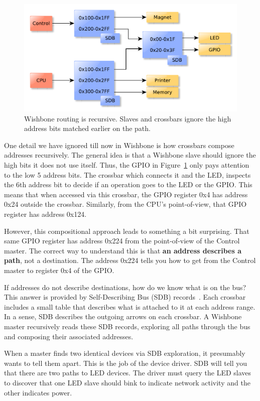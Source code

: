 \documentclass[a4paper]{jacow}
\begin{document}
\begin{figure}[t]
  \centering
  \includegraphics*[width=\columnwidth]{THHA2O03f6}
  \caption{Wishbone routing is recursive. Slaves and crossbars
  ignore the high address bits matched earlier on the path.}
  \label{fig:addressing}
\end{figure}

One detail we have ignored till now in Wishbone is how crossbars compose
addresses recursively.
The general idea is that a Wishbone slave should ignore the high bits it
does not use itself.
Thus, the GPIO in Figure~\ref{fig:addressing} only pays attention to the low 
5 address bits.
The crossbar which connects it and the LED,
inspects the 6th address bit to decide if an operation goes to the LED or
the GPIO.
This means that when accessed via this crossbar, 
the GPIO register 0x4 has address 0x24 outside the crossbar.
Similarly, from the CPU's point-of-view, that GPIO register has address 0x124.

However, this compositional approach leads to something a bit surprising.
That same GPIO register has address 0x224 from the point-of-view of 
the Control master.
The correct way to understand this is that \textbf{an address describes a path}, 
not a destination.
The address 0x224 tells you how to get from the Control master to register
0x4 of the GPIO.

If addresses do not describe destinations, how do we know what is on the bus?
This answer is provided by Self-Describing Bus (SDB) records~\cite{sdb}.
Each crossbar includes a small table that describes what is attached to it
at each address range.
In a sense, SDB describes the outgoing arrows on each crossbar.
A Wishbone master recursively reads these SDB records, 
exploring all paths through the bus and composing their associated addresses.

When a master finds two identical devices via SDB exploration,
it presumably wants to tell them apart.
This is the job of the device driver.
SDB will tell you that there are two paths to LED devices.
The driver must query the LED slaves to discover that one LED slave
should bink to indicate network activity and the other indicates power.
\end{document}
